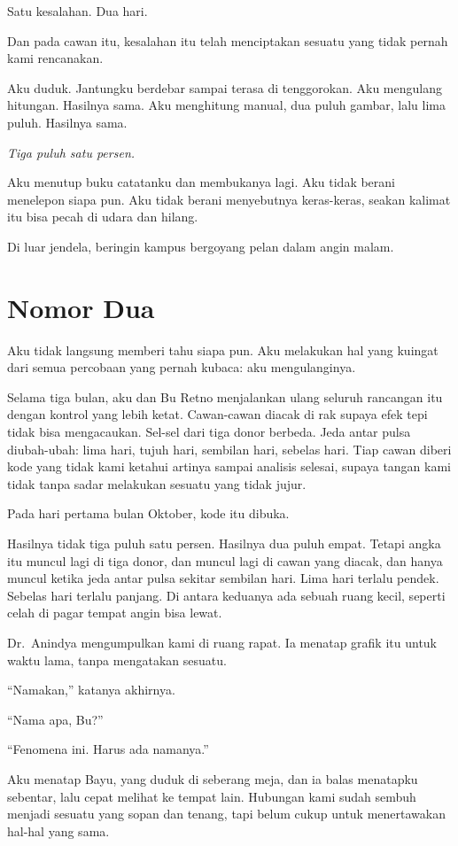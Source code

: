 \documentclass[11pt,twoside,openany]{book}
\begin{document}
Satu kesalahan. Dua hari.

Dan pada cawan itu, kesalahan itu telah menciptakan sesuatu yang tidak pernah kami rencanakan.

Aku duduk. Jantungku berdebar sampai terasa di tenggorokan. Aku mengulang hitungan. Hasilnya sama. Aku menghitung manual, dua puluh gambar, lalu lima puluh. Hasilnya sama.

\emph{Tiga puluh satu persen.}

Aku menutup buku catatanku dan membukanya lagi. Aku tidak berani menelepon siapa pun. Aku tidak berani menyebutnya keras-keras, seakan kalimat itu bisa pecah di udara dan hilang.

Di luar jendela, beringin kampus bergoyang pelan dalam angin malam.

\chapter{Nomor Dua}
Aku tidak langsung memberi tahu siapa pun. Aku melakukan hal yang kuingat dari semua percobaan yang pernah kubaca: aku mengulanginya.

Selama tiga bulan, aku dan Bu Retno menjalankan ulang seluruh rancangan itu dengan kontrol yang lebih ketat. Cawan-cawan diacak di rak supaya efek tepi tidak bisa mengacaukan. Sel-sel dari tiga donor berbeda. Jeda antar pulsa diubah-ubah: lima hari, tujuh hari, sembilan hari, sebelas hari. Tiap cawan diberi kode yang tidak kami ketahui artinya sampai analisis selesai, supaya tangan kami tidak tanpa sadar melakukan sesuatu yang tidak jujur.

Pada hari pertama bulan Oktober, kode itu dibuka.

Hasilnya tidak tiga puluh satu persen. Hasilnya dua puluh empat. Tetapi angka itu muncul lagi di tiga donor, dan muncul lagi di cawan yang diacak, dan hanya muncul ketika jeda antar pulsa sekitar sembilan hari. Lima hari terlalu pendek. Sebelas hari terlalu panjang. Di antara keduanya ada sebuah ruang kecil, seperti celah di pagar tempat angin bisa lewat.

Dr.~Anindya mengumpulkan kami di ruang rapat. Ia menatap grafik itu untuk waktu lama, tanpa mengatakan sesuatu.

``Namakan,'' katanya akhirnya.

``Nama apa, Bu?''

``Fenomena ini. Harus ada namanya.''

Aku menatap Bayu, yang duduk di seberang meja, dan ia balas menatapku sebentar, lalu cepat melihat ke tempat lain. Hubungan kami sudah sembuh menjadi sesuatu yang sopan dan tenang, tapi belum cukup untuk menertawakan hal-hal yang sama.
\end{document}

